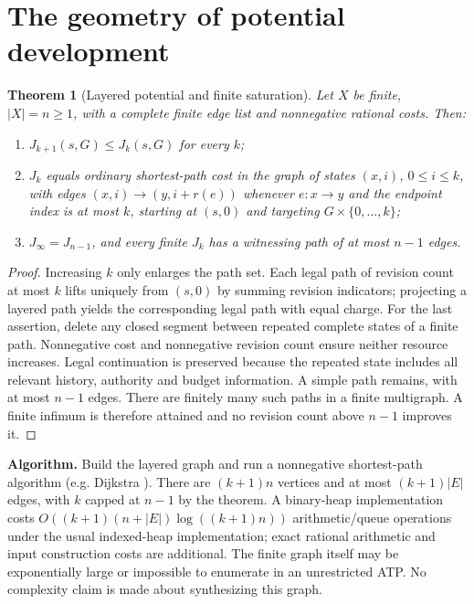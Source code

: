 \documentclass[11pt]{article}
\newtheorem{theorem}{Theorem}[section]
\theoremstyle{remark}\newtheorem{remark}[theorem]{Remark}
\begin{document}
\section{The geometry of potential development}
\begin{theorem}[Layered potential and finite saturation]\label{thm:layers}
Let $X$ be finite, $|X|=n\ge1$, with a complete finite edge list and nonnegative rational costs. Then:
\begin{enumerate}
\item $J_{k+1}(s,G)\le J_k(s,G)$ for every $k$;
\item $J_k$ equals ordinary shortest-path cost in the graph of states $(x,i)$, $0\le i\le k$, with edges $(x,i)\to(y,i+r(e))$ whenever $e:x\to y$ and the endpoint index is at most $k$, starting at $(s,0)$ and targeting $G\times\{0,\ldots,k\}$;
\item $J_\infty=J_{n-1}$, and every finite $J_k$ has a witnessing path of at most $n-1$ edges.
\end{enumerate}
\end{theorem}
\begin{proof}
Increasing $k$ only enlarges the path set. Each legal path of revision count at most $k$ lifts uniquely from $(s,0)$ by summing revision indicators; projecting a layered path yields the corresponding legal path with equal charge. For the last assertion, delete any closed segment between repeated complete states of a finite path. Nonnegative cost and nonnegative revision count ensure neither resource increases. Legal continuation is preserved because the repeated state includes all relevant history, authority and budget information. A simple path remains, with at most $n-1$ edges. There are finitely many such paths in a finite multigraph. A finite infimum is therefore attained and no revision count above $n-1$ improves it.
\end{proof}
\noindent\textbf{Algorithm.} Build the layered graph and run a nonnegative shortest-path algorithm (e.g. Dijkstra \cite{dijkstra}). There are $(k+1)n$ vertices and at most $(k+1)|E|$ edges, with $k$ capped at $n-1$ by the theorem. A binary-heap implementation costs $O((k+1)(n+|E|)\log((k+1)n))$ arithmetic/queue operations under the usual indexed-heap implementation; exact rational arithmetic and input construction costs are additional. The finite graph itself may be exponentially large or impossible to enumerate in an unrestricted ATP. No complexity claim is made about synthesizing this graph.
\end{document}
